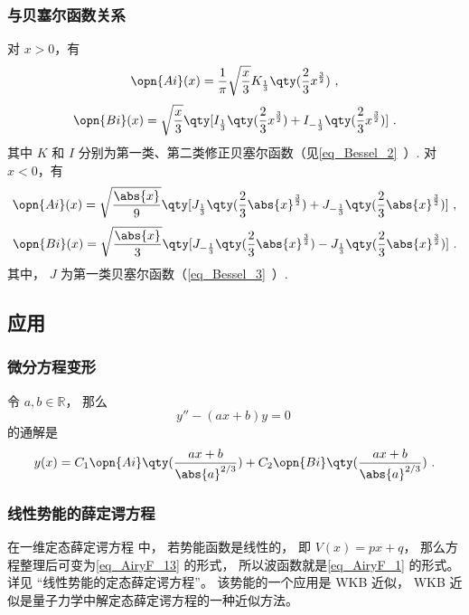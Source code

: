 \subsubsection{与贝塞尔函数关系}
对 $x>0$，有
\begin{equation}
\opn{Ai}(x)=\frac1\pi \sqrt{\frac x3} K_{\frac13} \qty(\frac23 x^{\frac32})~,
\end{equation}\begin{equation}
\opn{Bi}(x)=\sqrt{\frac x3} \qty[I_{\frac13}\qty(\frac23 x^{\frac32})+I_{-\frac13}\qty(\frac23 x^{\frac32})]~.
\end{equation}
其中 $K$ 和 $I$ 分别为第一类、第二类修正贝塞尔函数（见\autoref{eq_Bessel_2}~）.
对 $x<0$，有
\begin{equation}
\opn{Ai}(x)=\sqrt{\frac{\abs{x}}{9}}\qty[J_{\frac13}\qty(\frac23 \abs{x}^{\frac32})+J_{-\frac13}\qty(\frac23 \abs{x}^{\frac32})]~,
\end{equation}
\begin{equation}
\opn{Bi}(x)=\sqrt{\frac{\abs{x}}{3}} \qty[J_{-\frac13}\qty(\frac23 \abs{x}^{\frac32})-J_{\frac13}\qty(\frac23 \abs{x}^{\frac32})]~.
\end{equation}
其中， $J$ 为第一类贝塞尔函数（\autoref{eq_Bessel_3}~）.

\subsection{应用}
\subsubsection{微分方程变形}
令 $a, b\in \mathbb R$， 那么
\begin{equation}\label{eq_AiryF_13}
y'' - (ax + b) y = 0~
\end{equation}
的通解是
\begin{equation}\label{eq_AiryF_1}
y(x) = C_1\opn{Ai}\qty(\frac{ax+b}{\abs{a}^{2/3}}) + C_2 \opn{Bi}\qty(\frac{ax+b}{\abs{a}^{2/3}})~.
\end{equation}


\subsubsection{线性势能的薛定谔方程}
在一维定态薛定谔方程%
中， 若势能函数是线性的， 即 $V(x) = px + q$， 那么方程整理后可变为\autoref{eq_AiryF_13} 的形式， 所以波函数就是\autoref{eq_AiryF_1} 的形式。 详见 “线性势能的定态薛定谔方程”。 该势能的一个应用是 WKB 近似， WKB 近似是量子力学中解定态薛定谔方程的一种近似方法。
